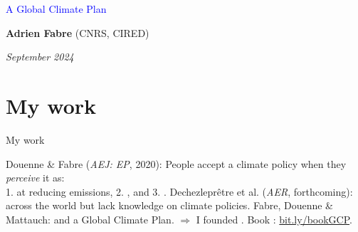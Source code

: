 \documentclass[aspectratio=169,xcolor=dvipsnames, 11pt,mathserif]{beamer}
\begin{document}
\begin{frame}
\thispagestyle{empty}
\begin{center}
\begin{LARGE}
\textcolor{blue}{A Global Climate Plan}
\end{LARGE}

\vspace{1cm}
\textbf{Adrien Fabre} (CNRS, CIRED) 

\medskip
{}
\textit{September 2024} 

\end{center}

\bigskip

\end{frame}

\section{My work}

\begin{frame}{My work}
    \begin{figure}
    \end{figure}
    \bbsp \ip Douenne \& Fabre (\textit{AEJ: EP}, 2020): People accept a climate policy when they \textit{perceive} it as:\\ 1.  at reducing emissions, 2. , and 3. .
    \ip Dechezleprêtre et al. (\textit{AER}, forthcoming):  across the world but lack knowledge on climate policies.\pause
    \ip Fabre, Douenne \& Mattauch:  and a Global Climate Plan.\pause
    \ip $\Rightarrow$ I founded .
    \ip Book : \href{https://bit.ly/bookGCP}{bit.ly/bookGCP}.
    \ee
    \begin{figure}
    \end{figure}
\end{frame}
\end{document}
